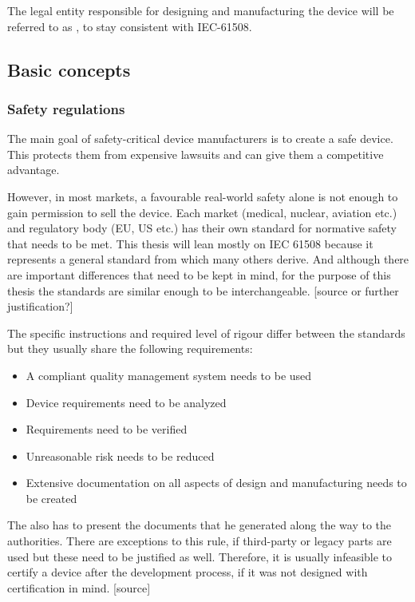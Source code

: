 The legal entity responsible for designing and manufacturing the device will be referred to as \mfg{}, to stay consistent with IEC-61508. 
\subsection{Basic concepts}
\subsubsection{Safety regulations}
The main goal of safety-critical device manufacturers is to create a safe device. This protects them from expensive lawsuits and can give them a competitive advantage.

However, in most markets, a favourable real-world safety alone is not enough to gain permission to sell the device.  Each market (medical, nuclear, aviation etc.) and regulatory body (EU, US etc.) has their own standard for normative safety that needs to be met. This thesis will lean mostly on IEC 61508  because it represents a general standard from which many others derive. And although there are important differences that need to be kept in mind, for the purpose of this thesis the standards are similar enough to be interchangeable. [source or further justification?]

The specific instructions and required level of rigour differ between the standards but they usually share the following requirements:

\begin{itemize}
\item A compliant quality management system needs to be used
\item Device requirements need to be analyzed
\item Requirements need to be verified
\item Unreasonable risk needs to be reduced
\item Extensive documentation on all aspects of design and manufacturing needs to be created
\end{itemize}

The \mfg{} also has to present the documents that he generated along the way to the authorities. There are exceptions to this rule, if third-party or legacy parts are used but these need to be justified as well. Therefore, it is usually infeasible to certify a device after the development process, if it was not designed with certification in mind. [source]

